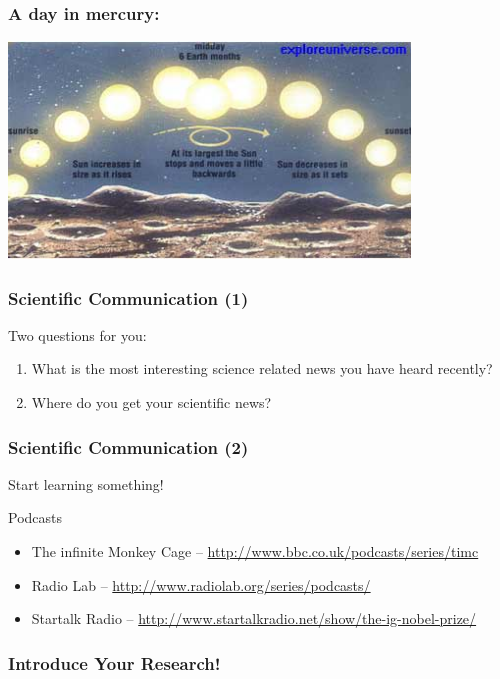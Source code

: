 \documentclass{beamer}
\begin{document}
\begin{frame}
  \frametitle{A day in mercury:}
  \begin{center}
    \includegraphics[width=0.8\textwidth]{img/mercuryday}
  \end{center}
\end{frame}

\begin{frame}
  \frametitle{Scientific Communication (1)}

  Two questions for you:

  \begin{enumerate}
  \item<1-> What is the most interesting science related news you have heard recently?
  \item<2-> Where do you get your scientific news?
  \end{enumerate}

\end{frame}

\begin{frame}
  \frametitle{Scientific Communication (2)}

  Start learning something!

  \begin{block}{Podcasts}
    \begin{itemize}
    \item The infinite Monkey Cage -- \url{http://www.bbc.co.uk/podcasts/series/timc} 
    \item Radio Lab -- \url{http://www.radiolab.org/series/podcasts/}
    \item Startalk Radio -- \url{http://www.startalkradio.net/show/the-ig-nobel-prize/}
    \end{itemize}
  \end{block}
\end{frame}


\begin{frame}
  \frametitle{Introduce Your Research!}
  \begin{block}{}
  \end{block}
\end{frame}
\end{document}
